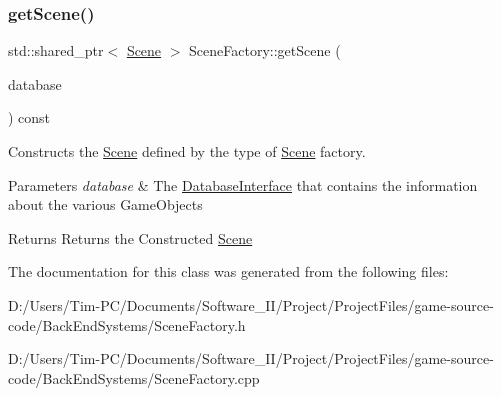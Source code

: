 \subsubsection{\texorpdfstring{get\+Scene()}{getScene()}}
{\footnotesize\ttfamily std\+::shared\+\_\+ptr$<$ \hyperlink{class_scene}{Scene} $>$ Scene\+Factory\+::get\+Scene (\begin{DoxyParamCaption}\item[{std\+::shared\+\_\+ptr$<$ \hyperlink{class_database_interface}{Database\+Interface} $>$}]{database }\end{DoxyParamCaption}) const}



Constructs the \hyperlink{class_scene}{Scene} defined by the type of \hyperlink{class_scene}{Scene} factory. 


\begin{DoxyParams}{Parameters}
{\em database} & The \hyperlink{class_database_interface}{Database\+Interface} that contains the information about the various Game\+Objects \\
\hline
\end{DoxyParams}
\begin{DoxyReturn}{Returns}
Returns the Constructed \hyperlink{class_scene}{Scene} 
\end{DoxyReturn}


The documentation for this class was generated from the following files\+:\begin{DoxyCompactItemize}
\item 
D\+:/\+Users/\+Tim-\/\+P\+C/\+Documents/\+Software\+\_\+\+I\+I/\+Project/\+Project\+Files/game-\/source-\/code/\+Back\+End\+Systems/Scene\+Factory.\+h\item 
D\+:/\+Users/\+Tim-\/\+P\+C/\+Documents/\+Software\+\_\+\+I\+I/\+Project/\+Project\+Files/game-\/source-\/code/\+Back\+End\+Systems/Scene\+Factory.\+cpp\end{DoxyCompactItemize}
